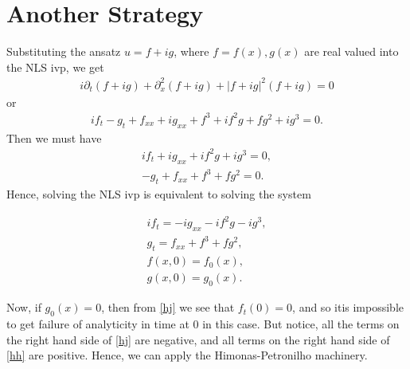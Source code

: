 \documentclass[12pt,reqno]{amsart}
\numberwithin{equation}{section}  %
\newcommand{\p}{\partial}
\begin{document}
\section{Another Strategy} 
\label{sec:another-strat}
Substituting the ansatz $u = f + ig$, where $f = f(x), g(x)$ are real valued into the NLS ivp, we get
%
%
\begin{equation*}
\begin{split}
  i \p_{t}(f + ig) + \p_{x}^{2}(f + ig) + | f + ig |^{2}(f + ig) = 0
\end{split}
\end{equation*}
%
%
or
%
%
\begin{equation*}
\begin{split}
  if_{t} - g_{t} + f_{xx} + ig_{xx} + f^{3} + if^{2}g + fg^{2} + ig^{3}=0.
\end{split}
\end{equation*}
%
%
Then we must have
\begin{gather*}
  if_{t} + ig_{xx} + if^{2}g + ig^{3}=0,
  \\
  -g_{t} + f_{xx} + f^{3} + fg^{2} = 0.
\end{gather*}
Hence, solving the NLS ivp is equivalent to solving the system

\begin{gather}
  if_{t} = -ig_{xx} - if^{2}g - ig^{3},
  \label{hj}
  \\
  g_{t} = f_{xx} + f^{3} + fg^{2},
  \label{hh}
  \\
  f(x,0) = f_{0}(x),
  \\
  g(x,0) = g_{0}(x).
\end{gather}

Now, if $g_{0}(x) = 0$, then from \eqref{hj} we see that $f_{t}(0) = 0$, and so itis impossible to get failure of analyticity in time at $0$ in this case. But notice, all the terms on the right hand side of \eqref{hj} are negative, and all terms on the right hand side of \eqref{hh} are positive. Hence, we can apply the Himonas-Petronilho machinery.
\end{document}

